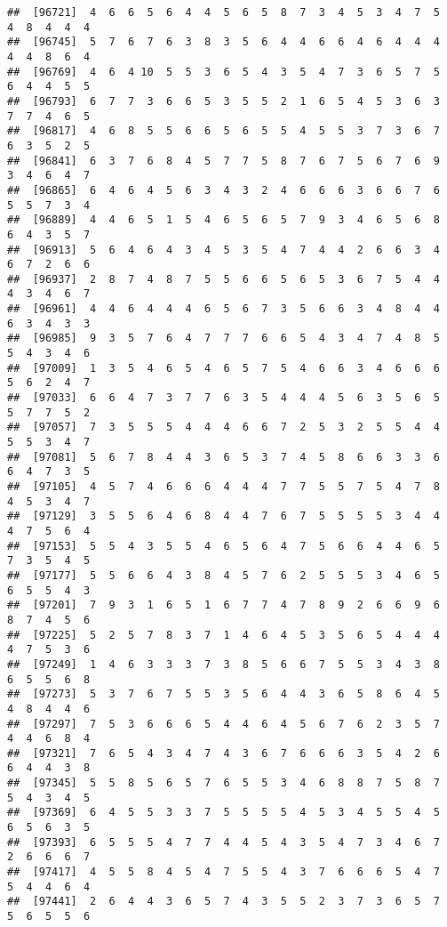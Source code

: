 \documentclass[
]{book}
\begin{document}
\begin{verbatim}
##  [96721]  4  6  6  5  6  4  4  5  6  5  8  7  3  4  5  3  4  7  5  4  8  4  4  4
##  [96745]  5  7  6  7  6  3  8  3  5  6  4  4  6  6  4  6  4  4  4  4  4  8  6  4
##  [96769]  4  6  4 10  5  5  3  6  5  4  3  5  4  7  3  6  5  7  5  6  4  4  5  5
##  [96793]  6  7  7  3  6  6  5  3  5  5  2  1  6  5  4  5  3  6  3  7  7  4  6  5
##  [96817]  4  6  8  5  5  6  6  5  6  5  5  4  5  5  3  7  3  6  7  6  3  5  2  5
##  [96841]  6  3  7  6  8  4  5  7  7  5  8  7  6  7  5  6  7  6  9  3  4  6  4  7
##  [96865]  6  4  6  4  5  6  3  4  3  2  4  6  6  6  3  6  6  7  6  5  5  7  3  4
##  [96889]  4  4  6  5  1  5  4  6  5  6  5  7  9  3  4  6  5  6  8  6  4  3  5  7
##  [96913]  5  6  4  6  4  3  4  5  3  5  4  7  4  4  2  6  6  3  4  6  7  2  6  6
##  [96937]  2  8  7  4  8  7  5  5  6  6  5  6  5  3  6  7  5  4  4  4  3  4  6  7
##  [96961]  4  4  6  4  4  4  6  5  6  7  3  5  6  6  3  4  8  4  4  6  3  4  3  3
##  [96985]  9  3  5  7  6  4  7  7  7  6  6  5  4  3  4  7  4  8  5  5  4  3  4  6
##  [97009]  1  3  5  4  6  5  4  6  5  7  5  4  6  6  3  4  6  6  6  5  6  2  4  7
##  [97033]  6  6  4  7  3  7  7  6  3  5  4  4  4  5  6  3  5  6  5  5  7  7  5  2
##  [97057]  7  3  5  5  5  4  4  4  6  6  7  2  5  3  2  5  5  4  4  5  5  3  4  7
##  [97081]  5  6  7  8  4  4  3  6  5  3  7  4  5  8  6  6  3  3  6  6  4  7  3  5
##  [97105]  4  5  7  4  6  6  6  4  4  4  7  7  5  5  7  5  4  7  8  4  5  3  4  7
##  [97129]  3  5  5  6  4  6  8  4  4  7  6  7  5  5  5  5  3  4  4  4  7  5  6  4
##  [97153]  5  5  4  3  5  5  4  6  5  6  4  7  5  6  6  4  4  6  5  7  3  5  4  5
##  [97177]  5  5  6  6  4  3  8  4  5  7  6  2  5  5  5  3  4  6  5  6  5  5  4  3
##  [97201]  7  9  3  1  6  5  1  6  7  7  4  7  8  9  2  6  6  9  6  8  7  4  5  6
##  [97225]  5  2  5  7  8  3  7  1  4  6  4  5  3  5  6  5  4  4  4  4  7  5  3  6
##  [97249]  1  4  6  3  3  3  7  3  8  5  6  6  7  5  5  3  4  3  8  6  5  5  6  8
##  [97273]  5  3  7  6  7  5  5  3  5  6  4  4  3  6  5  8  6  4  5  4  8  4  4  6
##  [97297]  7  5  3  6  6  6  5  4  4  6  4  5  6  7  6  2  3  5  7  4  4  6  8  4
##  [97321]  7  6  5  4  3  4  7  4  3  6  7  6  6  6  3  5  4  2  6  6  4  4  3  8
##  [97345]  5  5  8  5  6  5  7  6  5  5  3  4  6  8  8  7  5  8  7  5  4  3  4  5
##  [97369]  6  4  5  5  3  3  7  5  5  5  5  4  5  3  4  5  5  4  5  6  5  6  3  5
##  [97393]  6  5  5  5  4  7  7  4  4  5  4  3  5  4  7  3  4  6  7  2  6  6  6  7
##  [97417]  4  5  5  8  4  5  4  7  5  5  4  3  7  6  6  6  5  4  7  5  4  4  6  4
##  [97441]  2  6  4  4  3  6  5  7  4  3  5  5  2  3  7  3  6  5  7  5  6  5  5  6

\end{verbatim}
\end{document}
